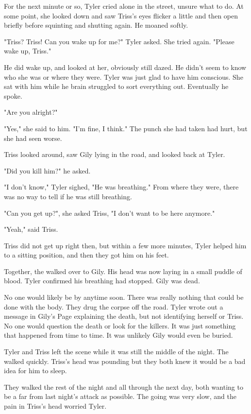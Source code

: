 \documentclass[courier]{sffms}
\begin{document}
For the next minute or so, Tyler cried alone in the
street, unsure what to do. At some point, she looked
down and saw Triss's eyes flicker a little and then
open briefly before squinting and shutting again.
He moaned softly.

"Triss? Triss! Can you wake up for me?" Tyler asked.
She tried again. "Please wake up, Triss."

He did wake up, and looked at her, obviously still
dazed. He didn't seem to know who she was or
where they were. Tyler was just glad to have him
conscious. She sat with him while he brain struggled
to sort everything out. Eventually he spoke.

"Are you alright?"

"Yes," she said to him. "I'm fine, I think." The punch
she had taken had hurt, but she had seen worse.

Triss looked around, saw Gily lying in the road, and
looked back at Tyler.

"Did you kill him?" he asked.

"I don't know," Tyler sighed, "He was breathing." From
where they were, there was no way to tell if he was
still breathing.

"Can you get up?", she asked Triss, "I don't want to
be here anymore."

"Yeah," said Triss.

Triss did not get up right then, but within a few more
minutes, Tyler helped him to a sitting position, and then
they got him on his feet.

Together, the walked over to Gily. His head was now
laying in a small puddle of blood. Tyler confirmed his
breathing had stopped. Gily was dead.

No one would likely be by anytime soon. There was
really nothing that could be done with the body. They
drug the corpse off the road. Tyler wrote out a message
in Gily's Page explaining the death, but not identifying
herself or Triss. No one would question the death or
look for the killers. It was just something that happened
from time to time. It was unlikely Gily would even be
buried.

Tyler and Triss left the scene while it was still the middle
of the night. The walked quickly. Triss's head was
pounding but they both knew it would be a bad idea for
him to sleep.

They walked the rest of the night and all through the
next day, both wanting to be a far from last night's
attack as possible. The going was very slow, and the
pain in Triss's head worried Tyler.
\end{document}
